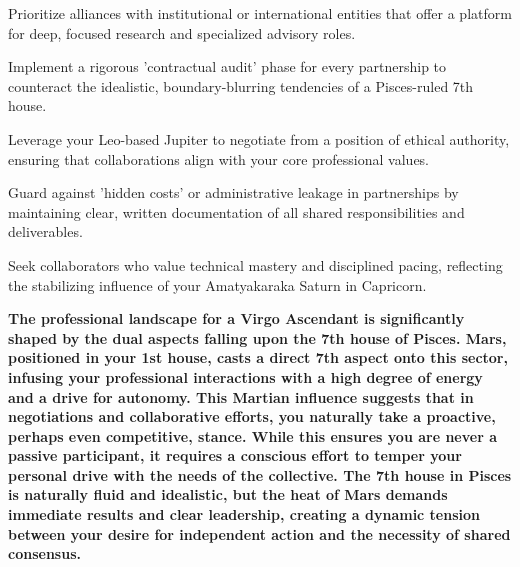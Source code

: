 \begin{diamondlist}
  \item {\fontsize{8.5}{12}\selectfont Prioritize alliances with institutional or international entities that offer a platform for deep, focused research and specialized advisory roles.}
  \item {\fontsize{8.5}{12}\selectfont Implement a rigorous 'contractual audit' phase for every partnership to counteract the idealistic, boundary-blurring tendencies of a Pisces-ruled 7th house.}
  \item {\fontsize{8.5}{12}\selectfont Leverage your Leo-based Jupiter to negotiate from a position of ethical authority, ensuring that collaborations align with your core professional values.}
  \item {\fontsize{8.5}{12}\selectfont Guard against 'hidden costs' or administrative leakage in partnerships by maintaining clear, written documentation of all shared responsibilities and deliverables.}
  \item {\fontsize{8.5}{12}\selectfont Seek collaborators who value technical mastery and disciplined pacing, reflecting the stabilizing influence of your Amatyakaraka Saturn in Capricorn.}
\end{diamondlist}


\label{topic19}

{\fontsize{9.5}{13.8}\selectfont\bfseries\color{DeepSlate} The professional landscape for a Virgo Ascendant is significantly shaped by the dual aspects falling upon the 7th house of Pisces. Mars, positioned in your 1st house, casts a direct 7th aspect onto this sector, infusing your professional interactions with a high degree of energy and a drive for autonomy. This Martian influence suggests that in negotiations and collaborative efforts, you naturally take a proactive, perhaps even competitive, stance. While this ensures you are never a passive participant, it requires a conscious effort to temper your personal drive with the needs of the collective. The 7th house in Pisces is naturally fluid and idealistic, but the heat of Mars demands immediate results and clear leadership, creating a dynamic tension between your desire for independent action and the necessity of shared consensus.}\par\vspace{2mm}


